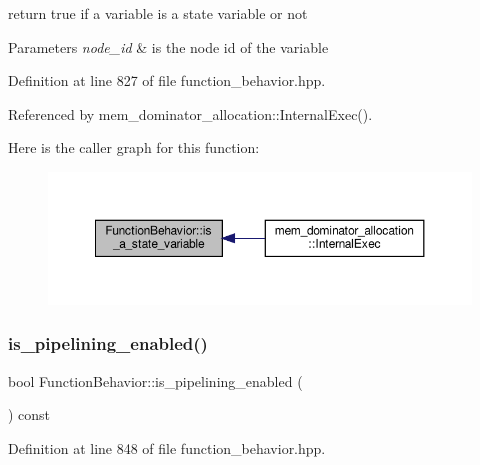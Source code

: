 return true if a variable is a state variable or not 


\begin{DoxyParams}{Parameters}
{\em node\+\_\+id} & is the node id of the variable \\
\hline
\end{DoxyParams}


Definition at line 827 of file function\+\_\+behavior.\+hpp.



Referenced by mem\+\_\+dominator\+\_\+allocation\+::\+Internal\+Exec().

Here is the caller graph for this function\+:
\nopagebreak
\begin{figure}[H]
\begin{center}
\leavevmode
\includegraphics[width=350pt]{d9/d45/classFunctionBehavior_a067992cea7b3f052c5f04a7ac0a8b3d7_icgraph}
\end{center}
\end{figure}
\mbox{\label{classFunctionBehavior_aaf9d8cbd3f3d119c24c22e7da798cab4}} 
\subsubsection{\texorpdfstring{is\+\_\+pipelining\+\_\+enabled()}{is\_pipelining\_enabled()}}
{\footnotesize\ttfamily bool Function\+Behavior\+::is\+\_\+pipelining\+\_\+enabled (\begin{DoxyParamCaption}{ }\end{DoxyParamCaption}) const\hspace{0.3cm}{\ttfamily [inline]}}



Definition at line 848 of file function\+\_\+behavior.\+hpp.

\mbox{\label{classFunctionBehavior_a63c7b45bb5c4d9d24d14ce19fc9f38cb}} 
